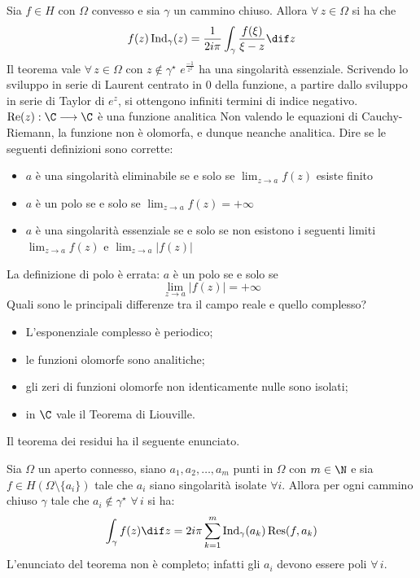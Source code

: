     Sia $f\in H$ con $\Omega$ convesso e sia $\gamma$ un cammino chiuso. Allora $\forall\,{z}\in\Omega$ si ha che \[
        f(z)\operatorname{Ind}_{\gamma}(z)=\frac{1}{2i\pi}\int_{\gamma}\frac{f(\xi)}{\xi-z}\dif z
    \]
Il teorema vale $\forall\,{z}\in\Omega$ con $z\notin\gamma^{\star}$
$e^{\frac{-1}{z^2}}$ ha una singolarità essenziale.
Scrivendo lo sviluppo in serie di Laurent centrato in 0 della funzione, a partire dallo sviluppo in serie di Taylor di $e^z$, si ottengono infiniti termini di indice negativo.
    $ \operatorname{Re}(z) : \C \longrightarrow \C $ è una funzione analitica
    Non valendo le equazioni di Cauchy-Riemann, la funzione non è olomorfa, e dunque neanche analitica.
    Dire se le seguenti definizioni sono corrette: \begin{itemize}
        \item $a$ è una singolarità eliminabile se e solo se $\lim_{z \to a} f(z)$ esiste finito
        \item $a$ è un polo se e solo se $\lim_{z\to a} f(z)=+\infty$
        \item $a$ è una singolarità essenziale se e solo se non esistono i seguenti limiti $\lim_{z \to a} f(z)$ e $\lim_{z \to a} \left\vert f(z)\right\vert$
    \end{itemize}
    La definizione di polo è errata: $ a $ è un polo se e solo se \[
        \lim_{z\to a} \left\vert f(z)\right\vert = + \infty
    \]
Quali sono le principali differenze tra il campo reale e quello complesso?
    \begin{itemize}
        \item L'esponenziale complesso è periodico; 
        \item le funzioni olomorfe sono analitiche;
        \item gli zeri di funzioni olomorfe non identicamente nulle sono isolati; 
        \item in $ \C $ vale il Teorema di Liouville.
    \end{itemize}
    Il teorema dei residui ha il seguente enunciato.

    Sia $\Omega$ un aperto connesso, siano $a_{1},a_{2},\dots,a_{m}$ punti in $\Omega$ con $m\in\N$ e sia $f\in H\left(\Omega\setminus\{a_{i}\}\right)$ tale che $a_{i}$ siano singolarità isolate $\forall{i}$. Allora per ogni cammino chiuso $\gamma$ tale che $a_{i}\notin\gamma^{\star}$ $\forall\,{i}$ si ha: \[\int_{\gamma}f(z)\dif z=2i\pi\sum_{k=1}^m \operatorname{Ind}_{\gamma}(a_{k})\operatorname{Res}(f,a_{k})\]
    L'enunciato del teorema non è completo; infatti gli $a_{i}$ devono essere poli $\forall\,{i}$.

